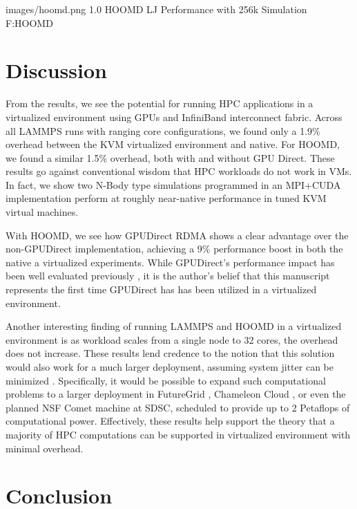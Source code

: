 \documentclass[10pt]{sigplanconf}
\begin{document}
  {images/hoomd.png}
  {1.0}
  {HOOMD LJ Performance with 256k Simulation}
  {F:HOOMD}


\section{Discussion}\label{discussion}

From the results, we see the potential for running HPC applications in a virtualized environment using GPUs and InfiniBand interconnect fabric. Across all LAMMPS runs with ranging core configurations, we found only a 1.9\% overhead between the KVM virtualized environment and native. For HOOMD, we found a similar 1.5\% overhead, both with and without GPU Direct. These results go against conventional wisdom that HPC workloads do not work in VMs. In fact, we show two N-Body type simulations programmed in an MPI+CUDA implementation perform at roughly near-native performance in tuned KVM virtual machines.  

With HOOMD, we see how GPUDirect RDMA shows a clear advantage over the
non-GPUDirect implementation, achieving a 9\% performance boost in both the
native a virtualized experiments.  While GPUDirect's performance impact has been well evaluated previously \cite{GPUDirect}, it is the author's belief that this manuscript represents the first time GPUDirect has has been utilized in a virtualized environment.  

Another interesting finding of running LAMMPS and HOOMD in a virtualized environment is as workload scales from a single node to 32 cores, the overhead does not increase. These results lend credence to the notion that this solution would also work for a much larger deployment, assuming system jitter can be minimized \cite{Seelam2010}. Specifically, it would be possible to expand such computational problems to a larger deployment in FutureGrid \cite{fox2013futuregrid}, Chameleon Cloud \cite{www-chameleon}, or even the planned NSF Comet machine at SDSC, scheduled to provide up to 2 Petaflops of computational power. Effectively, these results help support the theory that a majority of HPC computations can be supported in virtualized environment with minimal overhead. 


\section{Conclusion}\label{conclusion}
\end{document}
